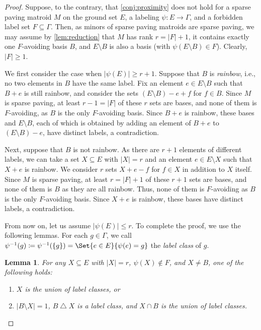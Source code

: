 \documentclass{article}
\DeclarePairedDelimiter{\set}{\{}{\}}
\newcommand{\symdif}{\mathbin{\triangle}}
\newtheorem{lemma}[theorem]{Lemma}
\theoremstyle{definition}
\begin{document}
\begin{proof}
Suppose, to the contrary, that \cref{conj:proximity} does not hold for a sparse paving matroid $M$ on the ground set $E$, a labeling $\psi \colon E \to \Gamma$, and a forbidden label set $F \subseteq \Gamma$.
Then, as minors of sparse paving matroids are sparse paving,
we may assume by \cref{lem:reduction} that $M$ has rank $r = |F|+1$, it contains exactly one $F$-avoiding basis $B$, and $E\setminus B$ is also a basis (with $\psi(E \setminus B) \in F$).
Clearly, $|F| \ge 1$.

We first consider the case when $|\psi(E)| \ge r + 1$.
Suppose that $B$ is \emph{rainbow}, i.e., no two elements in $B$ have the same label.
Fix an element $e \in E \setminus B$ such that $B + e$ is still rainbow, and consider the sets $(E \setminus B) - e + f$ for $f \in B$.
Since $M$ is sparse paving, at least $r-1 = |F|$ of these $r$ sets are bases, and none of them is $F$-avoiding, as $B$ is the only $F$-avoiding basis.
Since $B + e$ is rainbow, these bases and $E \setminus B$, each of which is obtained by adding an element of $B + e$ to $(E \setminus B) - e$, have distinct labels, a contradiction.

Next, suppose that $B$ is not rainbow.
As there are $r + 1$ elements of different labels, we can take a set $X \subseteq E$ with $|X| = r$ and an element $e \in E \setminus X$ such that $X + e$ is rainbow.
We consider $r$ sets $X + e - f$ for $f \in X$ in addition to $X$ itself.
Since $M$ is sparse paving, at least $r = |F| + 1$ of these $r + 1$ sets are bases, and none of them is $B$ as they are all rainbow.
Thus, none of them is $F$-avoiding as $B$ is the only $F$-avoiding basis.
Since $X + e$ is rainbow, these bases have distinct labels, a contradiction.

From now on, let us assume $|\psi(E)| \le r$.
To complete the proof, we use the following lemmas.
For each $g \in \Gamma$, we call $\psi^{-1}(g) \coloneqq \psi^{-1}(\set{g}) = \Set{e \in E}{\psi(e) = g}$ the \emph{label class} of $g$.

\begin{lemma}\label{lem:sparse-paving-union-lemma}
    For any $X \subseteq E$ with $|X| = r$, $\psi(X) \notin F$, and $X \ne B$, one of the following holds:
\begin{enumerate}[{label={\upshape (\arabic*)}}]
        \item $X$ is the union of label classes, or
        \item $|B \setminus X| = 1$, $B \symdif X$ is a label class, and $X \cap B$ is the union of label classes.\label{item:sparse-paving-union-lemma-2}
    \end{enumerate}
\end{lemma}


\end{proof}
\end{document}
